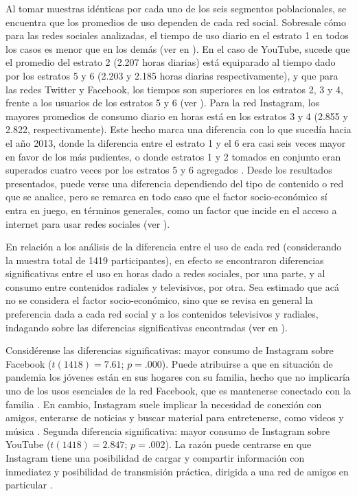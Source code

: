 \documentclass[spanish]{textolivre}
\begin{document}
Al tomar muestras idénticas por cada uno de los seis segmentos poblacionales, se encuentra que los promedios de uso dependen de cada red social. Sobresale cómo para las redes sociales analizadas, el tiempo de uso diario en el estrato 1 en todos los casos es menor que en los demás (ver en ). En el caso de YouTube, sucede que el promedio del estrato 2 (2.207 horas diarias) está equiparado al tiempo dado por los estratos 5 y 6 (2.203 y 2.185 horas diarias respectivamente), y que para las redes Twitter y Facebook, los tiempos son superiores en los estratos 2, 3 y 4, frente a los usuarios de los estratos 5 y 6 (ver ). Para la red Instagram, los mayores promedios de consumo diario en horas está en los estratos 3 y 4 (2.855 y 2.822, respectivamente). Este hecho marca una diferencia con lo que sucedía hacia el año 2013, donde la diferencia entre el estrato 1 y el 6 era casi seis veces mayor en favor de los más pudientes, o donde estratos 1 y 2 tomados en conjunto eran superados cuatro veces por los estratos 5 y 6 agregados \cite{narvaez_montoya2013}. Desde los resultados presentados, puede verse una diferencia dependiendo del tipo de contenido o red que se analice, pero se remarca en todo caso que el factor socio-económico sí entra en juego, en términos generales, como un factor que incide en el acceso a internet para usar redes sociales (ver ).

En relación a los análisis de la diferencia entre el uso de cada red (considerando la muestra total de 1419 participantes), en efecto se encontraron diferencias significativas entre el uso en horas dado a redes sociales, por una parte, y al consumo entre contenidos radiales y televisivos, por otra. Sea estimado que acá no se considera el factor socio-económico, sino que se revisa en general la preferencia dada a cada red social y a los contenidos televisivos y radiales, indagando sobre las diferencias significativas encontradas (ver en ).

Considérense las diferencias significativas: mayor consumo de Instagram sobre Facebook ($t(1418) =  7.61$; $p = .000$). Puede atribuirse a que en situación de pandemia los jóvenes están en sus hogares con su familia, hecho que no implicaría uno de los usos esenciales de la red Facebook, que es mantenerse conectado con la familia \cite{arcilacalderon2017}. En cambio, Instagram suele implicar la necesidad de conexión con amigos, enterarse de noticias y buscar material para entretenerse, como videos y música \cite{ting2015}. Segunda diferencia significativa: mayor consumo de Instagram sobre YouTube ($t(1418) = 2.847$; $p = .002$). La razón puede centrarse en que Instagram tiene una posibilidad de cargar y compartir información con inmediatez y posibilidad de transmisión práctica, dirigida a una red de amigos en particular \cite{ting2015}.
\end{document}
